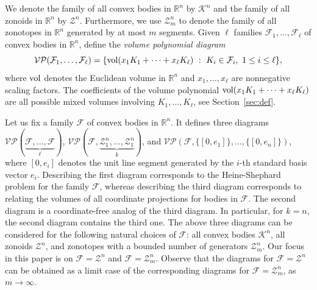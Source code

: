 \documentclass[11pt]{amsart}
\newcommand{\R}{\mathbb R}
\newcommand{\F}{\mathcal F}
\newcommand{\cV}{\mathcal V}
\newcommand{\VP}{\mathcal{VP}}
\newcommand{\cK}{\mathcal K}
\newcommand{\Z}{\mathcal Z}
\def\vol{{\rm vol}}
\theoremstyle{definition}
\theoremstyle{remark}
\begin{document}
We denote the family of all convex bodies in $\R^n$ by $\cK^n$ and the family of all zonoids in $\mathbb{R}^n$ by $\Z^n$. 
Furthermore, we use $\Z^n_m$ to denote the family of all zonotopes in $\mathbb{R}^n$ generated by at most $m$ segments. 
Given $\ell$ families $\F_1,\dots, \F_\ell$ of convex bodies in $\R^n$, define the {\it volume polynomial diagram}
$$
\VP(\F_1,\dots, \F_\ell)=\{\vol(x_1K_1+\dots+x_\ell K_\ell) \ : \ K_i\in\F_i,\ 1\leq i\leq \ell\},
$$
where $\vol$ denotes the Euclidean volume in $\R^n$ and $x_1,\dots, x_\ell$ are nonnegative scaling factors.
The coefficients of the volume polynomial $\vol(x_1K_1+\dots+x_\ell K_\ell)$
are all possible mixed volumes involving $K_1,\dots, K_\ell$, see Section~\ref{sec:def}. 

Let us fix a family $\F$ of convex bodies in $\R^n$. It defines three diagrams $\VP(\underbrace{\F,\dots, \F}_{\ell})$, 
$\VP(\F,\underbrace{\Z_1^n,\dots, \Z_1^n}_{k})$, and $\VP(\F, \{[0,e_1]\},\dots, \{[0,e_n]\})$, where $[0,e_i]$ denotes the unit line segment 
generated by the $i$-th standard basis vector $e_i$.
Describing the first diagram corresponds to the Heine-Shephard problem for the family $\F$, whereas describing the
third diagram corresponds to relating the volumes of all coordinate projections for bodies in $\F$. The second 
diagram is a coordinate-free analog of the third diagram. In particular, for $k=n$, the second diagram contains the third one. The above three diagrams 
can be considered for the following natural choices of $\F$: all convex bodies $\cK^n$, all zonoids $\Z^n$, and
zonotopes with a bounded number of generators $\Z^n_m$. Our focus in this paper is on $\F=\Z^n$ and $\F=\Z^n_m$. Observe that the diagrams for $\F=\Z^n$ can be obtained as a limit case of the corresponding diagrams for $\F=\Z^n_m$, as $m\to\infty$.


\end{document}
